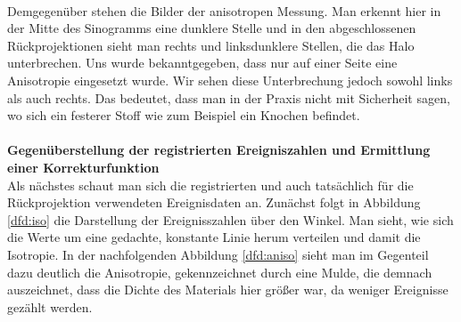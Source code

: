            \ \\
           Demgegenüber stehen die Bilder der anisotropen Messung. Man erkennt hier in der Mitte des Sinogramms eine dunklere Stelle und in den abgeschlossenen Rückprojektionen sieht man rechts und
           linksdunklere Stellen, die das Halo unterbrechen. Uns wurde bekanntgegeben, dass nur auf einer Seite eine Anisotropie eingesetzt wurde. Wir sehen diese Unterbrechung jedoch sowohl links als 
           auch rechts. Das bedeutet, dass man in der Praxis nicht mit Sicherheit sagen, wo sich ein festerer Stoff wie zum Beispiel ein Knochen befindet.\\ \ \\
        
        \textbf{Gegenüberstellung der registrierten Ereigniszahlen und Ermittlung einer Korrekturfunktion}\\
        Als nächstes schaut man sich die registrierten und auch tatsächlich für die Rückprojektion verwendeten Ereignisdaten an. Zunächst folgt in Abbildung \ref{dfd:iso} die Darstellung der Ereignisszahlen
        über den Winkel. Man sieht, wie sich die Werte um eine gedachte, konstante Linie herum verteilen und damit die Isotropie. In der nachfolgenden Abbildung \ref{dfd:aniso} sieht man im Gegenteil dazu 
        deutlich die Anisotropie, gekennzeichnet durch eine Mulde, die demnach auszeichnet, dass die Dichte des Materials hier größer war, da weniger Ereignisse gezählt werden. 
        
